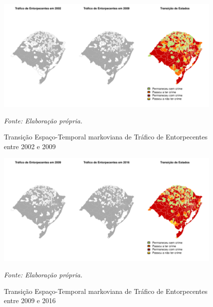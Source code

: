 \documentclass[12pt,openright,oneside,a4paper,english,french,spanish]{abntex2}
\numberwithin{table}{section} %
\numberwithin{figure}{section} %
\newcommand{\source}[1]{\textit{#1}}
\begin{document}
\begin{subappendices}
\begin{figure}[H]
\begin{center}
\includegraphics{TESE_DE_DOUTORADO_RENAN_FINAL-map_trafico_2002_2009}
\end{center}
\caption{Transição Espaço-Temporal markoviana de Tráfico de Entorpecentes entre 2002 e 2009}
\source{Fonte: Elaboração própria.}
\label{fig:mapas_trafico_markov_2002_2009}
\end{figure}

\begin{figure}[H]
\begin{center}
\includegraphics{TESE_DE_DOUTORADO_RENAN_FINAL-map_trafico_2009_2016}
\end{center}
\caption{Transição Espaço-Temporal markoviana de Tráfico de Entorpecentes entre 2009 e 2016}
\source{Fonte: Elaboração própria.}
\label{fig:mapas_trafico_markov_2009_2016}
\end{figure}


\end{subappendices}
\end{document}
